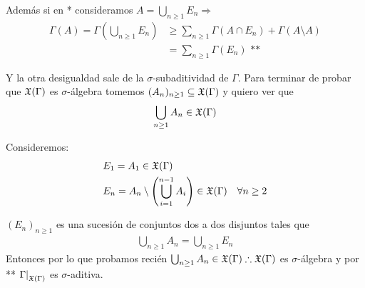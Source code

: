 Además si en * consideramos $A = \bigcup_{n \geq 1} E_n \Rightarrow$ \begin{align*}
    \Gamma(A) = \Gamma\left( \bigcup_{n \geq 1} E_n \right) & \geq \sum_{n \geq 1} \Gamma(A \cap E_n) + \Gamma(A \setminus A) \\
                                                            & = \sum_{n \geq 1} \Gamma(E_n) \text{ **}
\end{align*}

Y la otra desigualdad sale de la $\sigma$-subaditividad de $\Gamma$. Para terminar de probar que $\mathfrak{X}(\Gamma)$ es $\sigma$-álgebra tomemos
$(A_n)_{n \geq 1} \subseteq \mathfrak{X}(\Gamma)$ y quiero ver que \begin{align*}
    \bigcup_{n \geq 1} A_n \in \mathfrak{X}(\Gamma)
\end{align*}

Consideremos: \begin{align*}
     & E_1= A_1 \in \mathfrak{X}(\Gamma)                                                                          \\
     & E_n = A_n \setminus \left(\bigcup_{i = 1}^{n-1} A_i\right) \in \mathfrak{X}(\Gamma) \quad \forall n \geq 2
\end{align*}

$(E_n)_{n \geq 1}$ es una sucesión de conjuntos dos a dos disjuntos tales que \begin{align*}
    \bigcup_{n \geq 1} A_n = \bigcup_{n \geq 1} E_n
\end{align*}
Entonces por lo que probamos recién $\bigcup_{n \geq 1} A_n \in \mathfrak{X}(\Gamma) \therefore \mathfrak{X}(\Gamma)$ es $\sigma$-álgebra y por ** $\restr{\Gamma}{\mf{X}(\Gamma)}$ es $\sigma$-aditiva.